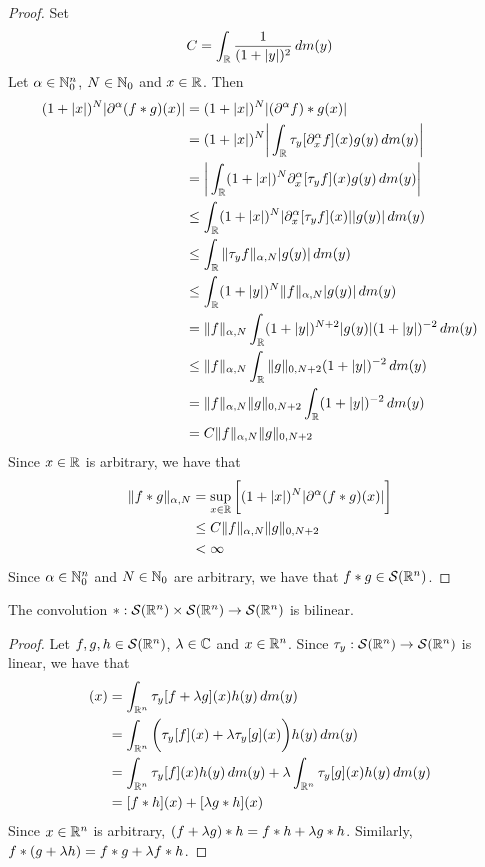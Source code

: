 \documentclass{book}
\begin{document}
	\begin{proof}
		Set 
		$$C = \int_{\mathbb{R}} \frac{1}{(1+|y|)^2} \, d m(y)$$
		Let $\alpha \in \mathbb{N}_0^n$, $N \in \mathbb{N}_0$ and $x \in \mathbb{R}$. Then 
		\begin{align*}
			(1+|x|)^N |\partial^{\alpha} (f*g)(x)|
			& =   (1+|x|)^N |(\partial^{\alpha}f )*g(x)| \\
			& =   (1+|x|)^N \bigg| \int_{\mathbb{R}}  \tau_y[\partial_x^{\alpha} f ](x) g(y) \, d m(y) \bigg|\\
			& =   \bigg| \int_{\mathbb{R}}  (1+|x|)^N \partial_x^{\alpha} [ \tau_y f ](x) g(y) \, d m(y) \bigg|\\
			& \leq \int_{\mathbb{R}}  (1+|x|)^N |\partial_x^{\alpha} [ \tau_y f ](x)| |g(y) | \, d m(y) \\
			& \leq \int_{\mathbb{R}}  \|\tau_y f\|_{\alpha, N} |g(y) | \, d m(y) \\
			& \leq \int_{\mathbb{R}}  (1 + |y|)^N \|f\|_{\alpha, N} |g(y) | \, d m(y) \\ 
			& = \|f\|_{\alpha, N}  \int_{\mathbb{R}} (1 + |y|)^{N+2} |g(y)| (1 + |y|)^{-2} \, d m(y) \\
			& \leq \|f\|_{\alpha, N}  \int_{\mathbb{R}}  \|g\|_{0, N+2} (1 + |y|)^{-2} \, d m(y) \\
			& = \|f\|_{\alpha, N} \|g\|_{0, N+2} \int_{\mathbb{R}}  (1 + |y|)^{-2} \, d m(y) \\
			&  = C \|f\|_{\alpha, N} \|g\|_{0, N+2}
		\end{align*}
		Since $x \in \mathbb{R}$ is arbitrary, we have that 
		\begin{align*}
			\|f*g\|_{\alpha, N}
			& = \sup_{x \in \mathbb{R}} \bigg[ (1+|x|)^N |\partial^{\alpha} (f*g)(x)| \bigg] \\
			& \leq C\|f\|_{\alpha, N} \|g\|_{0, N+2} \\
			& < \infty
		\end{align*}
		Since $\alpha \in \mathbb{N}_0^n$ and $N \in \mathbb{N}_0$ are arbitrary, we have that $f*g \in \mathcal{S}(\mathbb{R}^n)$.
	\end{proof}

	\begin{ex}
		The convolution $*: \mathcal{S}(\mathbb{R}^n) \times \mathcal{S}(\mathbb{R}^n) \rightarrow \mathcal{S}(\mathbb{R}^n)$ is bilinear.
	\end{ex}
	
	\begin{proof} 
		Let $f, g, h \in \mathcal{S}(\mathbb{R}^n)$, $\lambda \in \mathbb{C}$ and $x \in \mathbb{R}^n$. Since $\tau_y: \mathcal{S}(\mathbb{R}^n) \rightarrow \mathcal{S}(\mathbb{R}^n)$ is linear, we have that
		\begin{align*}
			[(f + \lam g) * h](x) 
			& = \int_{\R^n} \tau_y[f + \lam g](x) h(y) \dm(y) \\
			& = \int_{\R^n} \bigg( \tau_y[f](x) + \lam \tau_y[g](x) \bigg) h(y) \dm(y) \\
			& = \int_{\R^n} \tau_y[f](x) h(y) \dm(y)  + \lam \int_{\R^n} \tau_y[g](x) h(y) \dm(y) \\
			& = [f* h](x) + [\lam g * h](x)  
		\end{align*}
		Since $x \in \mathbb{R}^n$ is arbitrary, $(f + \lambda g) * h = f* h + \lambda g * h$. Similarly, $f* (g + \lambda h) = f* g + \lambda f* h$.
	\end{proof}
	
\end{document}
